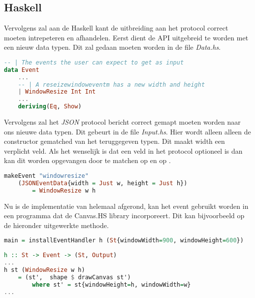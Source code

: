 \subsection{Haskell}
Vervolgens zal aan de Haskell kant de uitbreiding aan het protocol correct moeten intrepeteren en afhandelen. Eerst dient de API uitgebreid te worden met een nieuw data typen. Dit zal gedaan moeten worden in de file \emph{Data.hs}.
\begin{lstlisting}[style=densecode, language=Haskell]
-- | The events the user can expect to get as input
data Event
    ...
    -- | A reseizewindoweventm has a new width and height
    | WindowResize Int Int
    ...
    deriving(Eq, Show)
\end{lstlisting}
Vervolgens zal het \emph{JSON} protocol bericht correct gemapt moeten worden naar ons nieuwe data typen. Dit gebeurt in de file \emph{Input.hs}. Hier wordt alleen alleen de  constructor gematched van het teruggegeven  typen. Dit maakt width een verplicht veld. Als het wenselijk is dat een veld in het protocol optioneel is dan kan dit worden opgevangen door te matchen op  en op .
\begin{lstlisting}[style=densecode, language=Haskell]
makeEvent "windowresize"
    (JSONEventData{width = Just w, height = Just h})
        = WindowResize w h
\end{lstlisting}
Nu is de implementatie van  helemaal afgerond, kan het event gebruikt worden in een programma dat de Canvas.HS library incorporeert. Dit kan bijvoorbeeld op de hieronder uitgewerkte methode.
\begin{lstlisting}[style=densecode, language=Haskell]
main = installEventHandler h (St{windowWidth=900, windowHeight=600})
 
h :: St -> Event -> (St, Output)
...
h st (WindowResize w h)
    = (st',  shape $ drawCanvas st')
        where st' = st{windowHeight=h, windowWidth=w}
...
\end{lstlisting}


